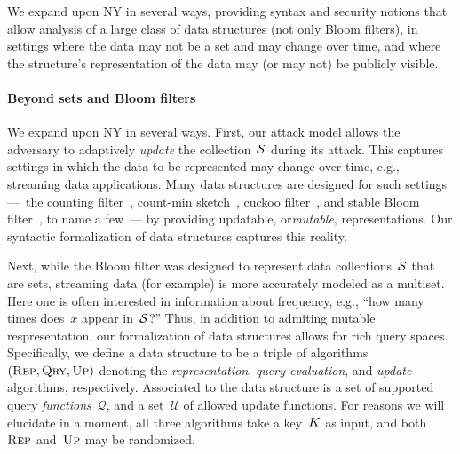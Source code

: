 We expand upon NY in several ways, providing syntax and security
notions that allow analysis of a large class of data structures (not
only Bloom filters), in settings where the data may not be a set and
may change over time, and where the structure's representation of the data may (or may not) be publicly visible.
 
\paragraph{Beyond sets and Bloom filters}
We expand upon NY in several ways.  First, our
attack model allows the adversary to adaptively \emph{update} the
collection~$\mathcal{S}$ during its attack.  This captures settings in which
the data to be represented may change over time, e.g., streaming data applications.
Many data structures are designed for such settings ---~the counting filter~\cite{fan2000summary}, count-min
sketch~\cite{cormode2005improved}, cuckoo filter~\cite{fan2014cuckoo}, and
stable Bloom filter~\cite{deng2006approximately}, to name a few~--- by providing
updatable, or\emph{mutable}, representations.  Our syntactic formalization of
data structures captures this reality. 

%
Next, while the Bloom filter was designed to represent data collections~$\mathcal{S}$
that are sets, streaming data (for example) is more accurately 
modeled as a multiset.  Here one is often interested in information
about frequency, e.g., ``how many times does~$x$ appear
in~$\mathcal{S}$?''
Thus, in addition to admiting mutable respresentation, our
formalization of data structures allows for rich
query spaces.  Specifically, we define a data structure to be a triple of algorithms $(\textnormal{\textsc{Rep}},
\textnormal{\textsc{Qry}}, \textnormal{\textsc{Up}})$ denoting the \emph{representation}, \emph{query-evaluation}, and
\emph{update} algorithms, respectively. Associated to the data structure is a
set of supported query \emph{functions}~$\mathcal{Q}$, and a set~$\mathcal{U}$
of allowed update functions.  For reasons we will elucidate in a moment, all
three algorithms take a key~$K$ as input, and both~$\textnormal{\textsc{Rep}}$ and~$\textnormal{\textsc{Up}}$ may be
randomized.

